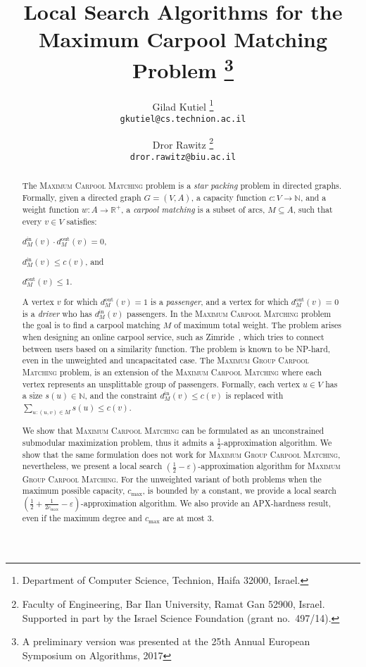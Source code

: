 \documentclass[11pt]{article}
\newcommand{\half}{\frac{1}{2}}
\newcommand{\inv}[1]{\frac{1}{#1}}
\def\R{\mathbb{R}}
\def\N{\mathbb{N}}
\newcommand{\din}[1][M]{d^{\text{in}}_{#1}}
\newcommand{\dout}[1][M]{d^{\text{out}}_{#1}}
\newcommand{\carpool}{\textsc{Maximum Carpool Matching}\xspace}
\newcommand{\gcp}{\textsc{Maximum Group Carpool Matching}\xspace}
\newcommand{\cmax}{c_{\max}}
\newcommand{\eps}{\varepsilon}
\begin{document}
\title{%
%
\textbf{Local Search Algorithms for the \\ Maximum Carpool Matching
  Problem}%
%
\thanks{A preliminary version was presented at the 25th Annual
  European Symposium on Algorithms, 2017}
%
}

\author{%
Gilad Kutiel%
\thanks{Department of Computer Science, Technion, Haifa 32000, Israel.} \\
\texttt{gkutiel@cs.technion.ac.il}
\and
Dror Rawitz%
\thanks{Faculty of Engineering, Bar Ilan University, Ramat Gan 52900, Israel.
Supported in part by the Israel Science Foundation (grant no.~497/14).} \\
\texttt{dror.rawitz@biu.ac.il}
}

\begin{titlepage}

\maketitle

\begin{abstract}
The \carpool problem is a \emph{star packing} problem in directed
graphs.  Formally, given a directed graph $G = (V, A)$, a capacity
function $c: V \rightarrow \N$, and a weight function $w:
A \rightarrow \R^+$, a \emph{carpool matching} is a subset of arcs,
$M \subseteq A$, such that every $v \in V$ satisfies:%
\begin{inparaenum}[(i)]
\item $\din[M](v) \cdot \dout[M](v) = 0$,
\item $\din[M](v) \leq c(v)$, and 
\item $\dout[M](v) \leq 1$.
\end{inparaenum}
A vertex $v$ for which $\dout[M](v) = 1$ is a \emph{passenger}, and a
vertex for which $\dout[M](v) = 0$ is a \emph{driver} who has
$\din[M](v)$ passengers.  In the \carpool problem the goal is to find
a carpool matching $M$ of maximum total weight.
%
The problem arises when designing an online carpool service, such as
Zimride~\cite{zimride}, which tries to connect between users based on
a similarity function.  The problem is known to be NP-hard, even in
the unweighted and uncapacitated case.
%
The \gcp problem, is an extension of the \carpool where each vertex
represents an unsplittable group of passengers.  Formally, each vertex
$u \in V$ has a size $s(u) \in \N$, and the constraint $\din(v) \leq
c(v)$ is replaced with $\sum_{u:(u,v) \in M} s(u) \leq c(v)$.

We show that \carpool can be formulated as an unconstrained submodular
maximization problem, thus it admits a $\frac{1}{2}$-approximation
algorithm.  We show that the same formulation does not work for \gcp,
nevertheless, we present a local search $(\frac{1}{2}
- \eps)$-approximation algorithm for \gcp.
%
For the unweighted variant of both problems when the maximum possible
capacity, $\cmax$, is bounded by a constant, we provide a local search
$(\half + \inv{2\cmax} - \eps)$-approximation algorithm.  We also
provide an APX-hardness result, even if the maximum degree and $\cmax$
are at most $3$.
\end{abstract}



\end{titlepage}
\end{document}
